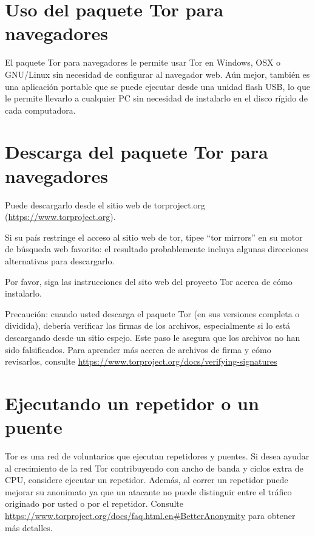 \documentclass[10pt,a5paper,twoside,,]{book}
\begin{document}
\section{Uso del paquete Tor para
navegadores}\label{uso-del-paquete-tor-para-navegadores}

El paquete Tor para navegadores le permite usar Tor en Windows, OSX o
GNU/Linux sin necesidad de configurar al navegador web. Aún mejor,
también es una aplicación portable que se puede ejecutar desde una
unidad flash USB, lo que le permite llevarlo a cualquier PC sin
necesidad de instalarlo en el disco rígido de cada computadora.

\section{Descarga del paquete Tor para
navegadores}\label{descarga-del-paquete-tor-para-navegadores}

Puede descargarlo desde el sitio web de torproject.org
(\url{https://www.torproject.org}).

Si su país restringe el acceso al sitio web de tor, tipee ``tor
mirrors'' en su motor de búsqueda web favorito: el resultado
probablemente incluya algunas direcciones alternativas para descargarlo.

Por favor, siga las instrucciones del sito web del proyecto Tor acerca
de cómo instalarlo.

Precaución: cuando usted descarga el paquete Tor (en sus versiones
completa o dividida), debería verificar las firmas de los archivos,
especialmente si lo está descargando desde un sitio espejo. Este paso le
asegura que los archivos no han sido falsificados. Para aprender más
acerca de archivos de firma y cómo revisarlos, consulte
\url{https://www.torproject.org/docs/verifying-signatures}

\section{Ejecutando un repetidor o un
puente}\label{ejecutando-un-repetidor-o-un-puente}

Tor es una red de voluntarios que ejecutan repetidores y puentes. Si
desea ayudar al crecimiento de la red Tor contribuyendo con ancho de
banda y ciclos extra de CPU, considere ejecutar un repetidor. Además, al
correr un repetidor puede mejorar su anonimato ya que un atacante no
puede distinguir entre el tráfico originado por usted o por el
repetidor. Consulte
\url{https://www.torproject.org/docs/faq.html.en\#BetterAnonymity} para
obtener más detalles.
\end{document}
